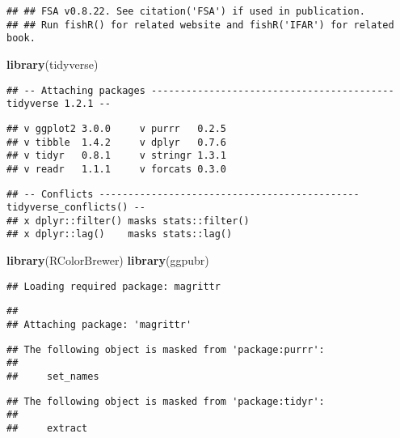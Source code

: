 \documentclass[]{article}
\newenvironment{Shaded}{\begin{snugshade}}{\end{snugshade}}
\newcommand{\KeywordTok}[1]{\textcolor[rgb]{0.13,0.29,0.53}{\textbf{#1}}}
\newcommand{\NormalTok}[1]{#1}
\begin{document}
\begin{verbatim}
## ## FSA v0.8.22. See citation('FSA') if used in publication.
## ## Run fishR() for related website and fishR('IFAR') for related book.
\end{verbatim}

\begin{Shaded}
\begin{Highlighting}[]
\KeywordTok{library}\NormalTok{(tidyverse)}
\end{Highlighting}
\end{Shaded}

\begin{verbatim}
## -- Attaching packages ------------------------------------------ tidyverse 1.2.1 --
\end{verbatim}

\begin{verbatim}
## v ggplot2 3.0.0     v purrr   0.2.5
## v tibble  1.4.2     v dplyr   0.7.6
## v tidyr   0.8.1     v stringr 1.3.1
## v readr   1.1.1     v forcats 0.3.0
\end{verbatim}

\begin{verbatim}
## -- Conflicts --------------------------------------------- tidyverse_conflicts() --
## x dplyr::filter() masks stats::filter()
## x dplyr::lag()    masks stats::lag()
\end{verbatim}

\begin{Shaded}
\begin{Highlighting}[]
\KeywordTok{library}\NormalTok{(RColorBrewer)}
\KeywordTok{library}\NormalTok{(ggpubr)}
\end{Highlighting}
\end{Shaded}

\begin{verbatim}
## Loading required package: magrittr
\end{verbatim}

\begin{verbatim}
## 
## Attaching package: 'magrittr'
\end{verbatim}

\begin{verbatim}
## The following object is masked from 'package:purrr':
## 
##     set_names
\end{verbatim}

\begin{verbatim}
## The following object is masked from 'package:tidyr':
## 
##     extract
\end{verbatim}
\end{document}
